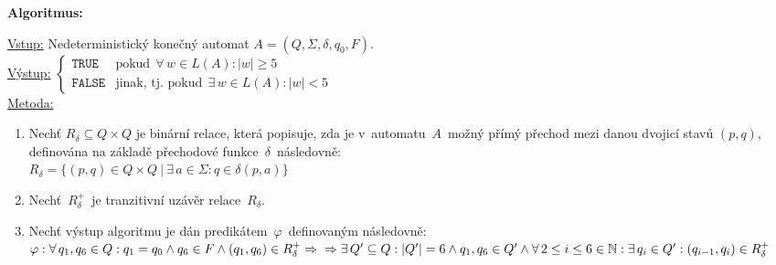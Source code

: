 \documentclass[a4paper, 11pt]{scrartcl}
\begin{document}
    \textbf{Algoritmus:}
    \begin{addmargin}[10pt]{0pt}
        \underline{Vstup:}
            Nedeterministický konečný automat $ A = (Q, \Sigma, \delta,
            q_0, F) $.
        \\[5pt]
        \underline{Výstup:}
            $
                \begin{cases}
                    \mathtt{TRUE} &
                    \text{pokud}\ \ \forall\,w \in L(A): |w| \geq 5 \\
                    \mathtt{FALSE} &
                    \text{jinak, tj. pokud}\ \ \exists\,w \in L(A): |w| < 5
                \end{cases}
            $
        \\[5pt]
        \underline{Metoda:}
            \begin{enumerate}
                \item
                    Nechť $ R_\delta \subseteq Q \times Q $ je binární relace,
                    která popisuje, zda je v~automatu~$ A $~možný přímý přechod
                    mezi danou dvojicí stavů $ (p, q) $, definována na základě
                    přechodové funkce~$ \delta $~následovně: \\
                    $ R_\delta = \{(p, q) \in Q \times Q\ |\ \exists\,a \in
                    \Sigma: q \in \delta(p, a)\} $

                \item
                    Nechť~$ R_\delta^+ $~je tranzitivní uzávěr
                    relace~$ R_\delta $.

                \item
                    Nechť výstup algoritmu je dán
                    predikátem~$ \varphi $~definovaným následovně: \\
                    $ \varphi: \forall\,q_1, q_6 \in Q: q_1 = q_0 \wedge q_6
                    \in F  \wedge (q_1, q_6) \in R_\delta^+ \Rightarrow \\
                    \Rightarrow \exists\,Q^\prime \subseteq Q: |Q^\prime| =
                    6 \wedge q_1, q_6 \in Q^\prime \wedge \forall\,2 \leq i
                    \leq 6 \in \mathbb{N}: \exists\,q_i \in Q^\prime:
                    (q_{i - 1}, q_i) \in R_\delta^+ $
            \end{enumerate}
    \end{addmargin}
\end{document}
